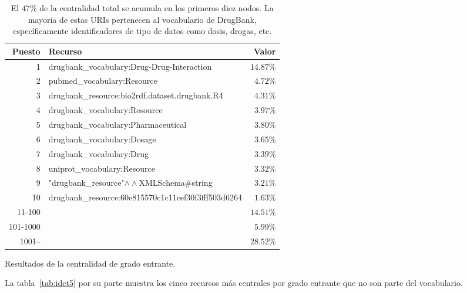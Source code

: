 \begin{table}[ht]
  \centering
  \begin{tabular}{|r|l|r|}\hline
    \bf{Puesto} & \bf{Recurso} & \bf{Valor} \\\hline
     1 & drugbank\_vocabulary:Drug-Drug-Interaction				 	 & $14.87\%$ \\\hline
     2 & pubmed\_vocabulary:Resource												 & $4.72\%$ \\\hline
     3 & drugbank\_resource:bio2rdf.dataset.drugbank.R4			 & $4.31\%$ \\\hline
     4 & drugbank\_vocabulary:Resource											 & $3.97\%$ \\\hline
     5 & drugbank\_vocabulary:Pharmaceutical								 & $3.80\%$ \\\hline
     6 & drugbank\_vocabulary:Dosage												 & $3.65\%$ \\\hline
     7 & drugbank\_vocabulary:Drug													 & $3.39\%$ \\\hline
     8 & uniprot\_vocabulary:Resource												 & $3.32\%$ \\\hline
     9 & "drugbank\_resource"$\wedge\wedge$XMLSchema\#string & $3.21\%$ \\\hline
    10 & drugbank\_resource:60e815570c1c11cef30f3fff503d6264 & $1.63\%$ \\\hline
    11-100 		& & $14.51\%$ \\\hline
    101-1000  & & $5.99\%$ \\\hline
    1001--    & & $28.52\%$ \\\hline
  \end{tabular}
  \caption{Resultados de la centralidad de grado entrante.}\label{tab:idcres}
  \vspace{-.2cm}
  \caption*{\small
    El $47\%$ de la centralidad total se acumula en los primeros diez nodos.
    La mayoría de estas URIs pertenecen al vocabulario de DrugBank,
    específicamente identificadores de tipo de datos como dosis, drogas, etc.
  }
\end{table}

La tabla~\ref{tab:idct5} por su parte muestra los cinco recursos más centrales
por grado entrante que no son parte del vocabulario.

